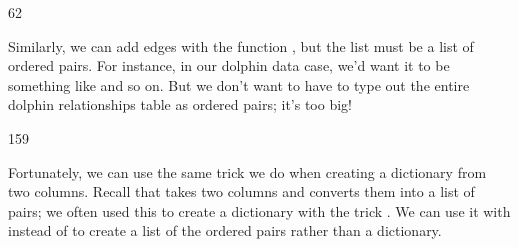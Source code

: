 \documentclass[letterpaper,10pt,english]{sphinxmanual}
\begin{document}
\begin{sphinxVerbatim}[commandchars=\\\{\}]
62
\end{sphinxVerbatim}

Similarly, we can add edges with the function , but the list must be a list of ordered pairs.  For instance, in our dolphin data case, we’d want it to be something like  and so on.  But we don’t want to have to type out the entire dolphin relationships table as ordered pairs; it’s too big!

\begin{sphinxVerbatim}[commandchars=\\\{\}]
  
\end{sphinxVerbatim}

\begin{sphinxVerbatim}[commandchars=\\\{\}]
159
\end{sphinxVerbatim}

Fortunately, we can use the same trick we do when creating a dictionary from two columns.  Recall that  takes two columns and converts them into a list of pairs; we often used this to create a dictionary with the trick .  We can use it with  instead of  to create a list of the ordered pairs rather than a dictionary.

\begin{sphinxVerbatim}[commandchars=\\\{\}]
         
\PYG{p}{[}\PYG{p}{]}                                     
\end{sphinxVerbatim}

\begin{sphinxVerbatim}
\end{sphinxVerbatim}
\end{document}
